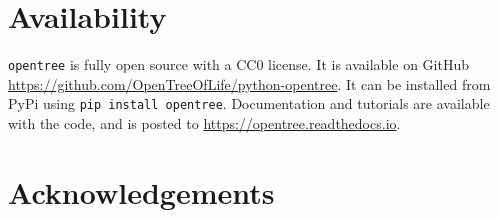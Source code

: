 \documentclass[oupdraft]{sysbio_sse}
\begin{document}
\bigskip

\section{Availability}
\label{sec5}

\texttt{opentree} is fully open source with a CC0 license. It is available on GitHub \url{ https://github.com/OpenTreeOfLife/python-opentree}. It can be installed from PyPi using \texttt{pip install opentree}. Documentation and tutorials are available with the code, and is posted to \url{https://opentree.readthedocs.io}.

\section{Acknowledgements}


\bigskip\bigskip










\end{document}
